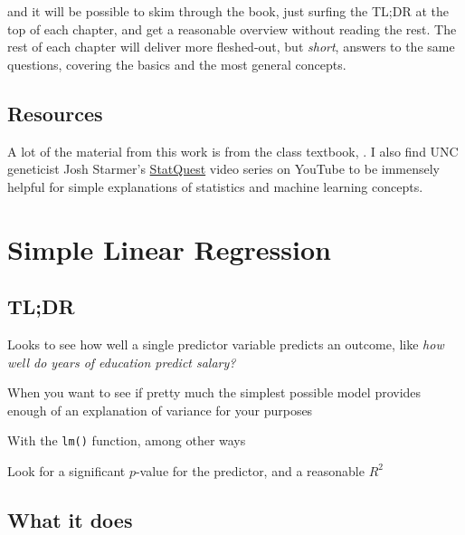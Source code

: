 \documentclass[
]{book}
\providecommand{\tightlist}{%
  \setlength{\itemsep}{0pt}\setlength{\parskip}{0pt}}
\begin{document}
and it will be possible to skim through the book, just surfing the TL;DR at the top of each chapter, and get a reasonable overview without reading the rest. The rest of each chapter will deliver more fleshed-out, but \emph{short}, answers to the same questions, covering the basics and the most general concepts.

\hypertarget{resources}{%
\section{Resources}\label{resources}}

A lot of the material from this work is from the class textbook, \citet{ISLR}. I also find UNC geneticist Josh Starmer's \href{https://www.youtube.com/channel/UCtYLUTtgS3k1Fg4y5tAhLbw}{StatQuest} video series on YouTube to be immensely helpful for simple explanations of statistics and machine learning concepts.

\hypertarget{simple-linear-regression}{%
\chapter{Simple Linear Regression}\label{simple-linear-regression}}

\hypertarget{tldr}{%
\section{TL;DR}\label{tldr}}

\begin{description}
\tightlist
\item[What it does]
Looks to see how well a single predictor variable predicts an outcome, like \emph{how well do years of education predict salary?}
\item[When to do it]
When you want to see if pretty much the simplest possible model provides enough of an explanation of variance for your purposes
\item[How to do it]
With the \texttt{lm()} function, among other ways
\item[How to assess it]
Look for a significant \(p\)-value for the predictor, and a reasonable \(R^2\)
\end{description}

\hypertarget{what-it-does}{%
\section{What it does}\label{what-it-does}}
\end{document}
